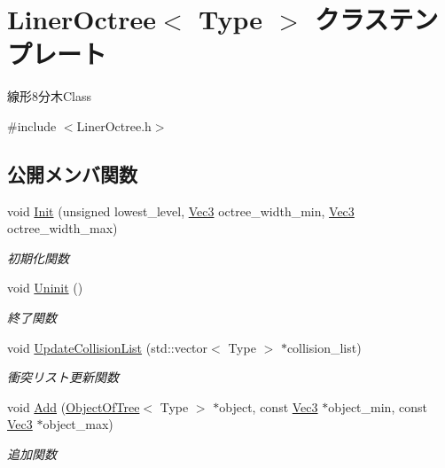 \hypertarget{class_liner_octree}{}\section{Liner\+Octree$<$ Type $>$ クラステンプレート}
\label{class_liner_octree}


線形8分木\+Class  




{\ttfamily \#include $<$Liner\+Octree.\+h$>$}

\subsection*{公開メンバ関数}
\begin{DoxyCompactItemize}
\item 
void \mbox{\hyperlink{class_liner_octree_a715d655c722c00c002d0bb006d0600d8}{Init}} (unsigned lowest\+\_\+level, \mbox{\hyperlink{_vector3_d_8h_ab16f59e4393f29a01ec8b9bbbabbe65d}{Vec3}} octree\+\_\+width\+\_\+min, \mbox{\hyperlink{_vector3_d_8h_ab16f59e4393f29a01ec8b9bbbabbe65d}{Vec3}} octree\+\_\+width\+\_\+max)
\begin{DoxyCompactList}\small\item\em 初期化関数 \end{DoxyCompactList}\item 
void \mbox{\hyperlink{class_liner_octree_a86b5b9bc86630644e84508ff385cda69}{Uninit}} ()
\begin{DoxyCompactList}\small\item\em 終了関数 \end{DoxyCompactList}\item 
void \mbox{\hyperlink{class_liner_octree_a89f700400ce575b869633328755d23cb}{Update\+Collision\+List}} (std\+::vector$<$ Type $>$ $\ast$collision\+\_\+list)
\begin{DoxyCompactList}\small\item\em 衝突リスト更新関数 \end{DoxyCompactList}\item 
void \mbox{\hyperlink{class_liner_octree_ac5773a5193942a68f77a33baed9d69d4}{Add}} (\mbox{\hyperlink{class_object_of_tree}{Object\+Of\+Tree}}$<$ Type $>$ $\ast$object, const \mbox{\hyperlink{_vector3_d_8h_ab16f59e4393f29a01ec8b9bbbabbe65d}{Vec3}} $\ast$object\+\_\+min, const \mbox{\hyperlink{_vector3_d_8h_ab16f59e4393f29a01ec8b9bbbabbe65d}{Vec3}} $\ast$object\+\_\+max)
\begin{DoxyCompactList}\small\item\em 追加関数 \end{DoxyCompactList}\end{DoxyCompactItemize}
